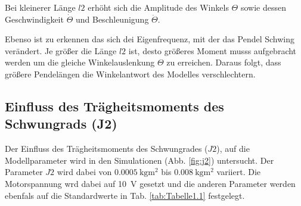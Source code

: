 Bei kleinerer Länge $l2$ erhöht sich die Amplitude des Winkels $\Theta$ sowie dessen Geschwindigkeit $\dot\Theta$ und Beschleunigung $\ddot\Theta$. 

Ebenso ist zu erkennen das sich dei Eigenfrequenz, mit der das Pendel Schwing verändert.
Je größer die Länge $l2$ ist, desto größeres Moment musss aufgebracht werden um die gleiche Winkelauslenkung $\Theta$ zu erreichen. 
Daraus folgt, dass größere Pendelängen die Winkelantwort des Modelles verschlechtern. 

\subsection*{Einfluss des Trägheitsmoments des Schwungrads (J2)}
Der Einfluss des Trägheitsmoments des Schwungrades ($J2$), auf die Modellparameter wird in den Simulationen (Abb. \ref{fig:j2}) untersucht. 
Der Parameter $J2$ wird dabei von $\SI{0.0005}{\kg\m^2}$ bis $\SI{0.008}{\kg\m^2}$ variiert.
Die Motorspannung wrd dabei auf \SI{10}{\volt} gesetzt und die anderen Parameter werden ebenfals auf die Standardwerte in Tab. \ref{tab:Tabelle1.1} festgelegt.\\
\pagebreak

